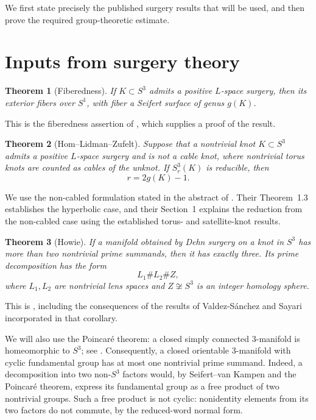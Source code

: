 \documentclass[11pt]{article}
\newcommand{\surg}[2]{S^3_{#1}(#2)}
\newtheorem{theorem}{Theorem}
\begin{document}
We first state precisely the published surgery results that will be
used, and then prove the required group-theoretic estimate.

\section{Inputs from surgery theory}

\begin{theorem}[Fiberedness]\label{thm:fibered}
If \(K\subset S^3\) admits a positive \(L\)-space surgery, then its
exterior fibers over \(S^1\), with fiber a Seifert surface of genus
\(g(K)\).
\end{theorem}

This is the fiberedness assertion of
\cite[Theorem~1]{BaldwinSivek}, which supplies a proof of the result.

\begin{theorem}[Hom--Lidman--Zufelt]\label{thm:slope}
Suppose that a nontrivial knot \(K\subset S^3\) admits a positive
\(L\)-space surgery and is not a cable knot, where nontrivial torus
knots are counted as cables of the unknot. If \(\surg{r}{K}\) is
reducible, then
\[
    r=2g(K)-1.
\]
\end{theorem}

We use the non-cabled formulation stated in the abstract of
\cite{HLZ}. Their Theorem~1.3 establishes the hyperbolic case, and
their Section~1 explains the reduction from the non-cabled case using
the established torus- and satellite-knot results.

\begin{theorem}[Howie]\label{thm:three}
If a manifold obtained by Dehn surgery on a knot in \(S^3\) has more
than two nontrivial prime summands, then it has exactly three.
Its prime decomposition has the form
\[
    L_1\#L_2\# Z,
\]
where \(L_1,L_2\) are nontrivial lens spaces and \(Z\not\cong S^3\) is
an integer homology sphere.
\end{theorem}

This is \cite[Corollary~5.3]{Howie}, including the consequences of the
results of Valdez-S\'anchez and Sayari incorporated in that corollary.

We will also use the Poincar\'e theorem: a closed simply connected
\(3\)-manifold is homeomorphic to \(S^3\); see \cite{MorganTian}.
Consequently, a closed orientable \(3\)-manifold with cyclic
fundamental group has at most one nontrivial prime summand.
Indeed, a decomposition into two non-\(S^3\) factors would, by
Seifert--van Kampen and the Poincar\'e theorem, express its fundamental
group as a free product of two nontrivial groups. Such a free product
is not cyclic: nonidentity elements from its two factors do not
commute, by the reduced-word normal form.
\end{document}
